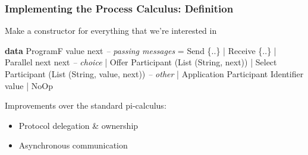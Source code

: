 \documentclass[12pt]{beamer}
\newenvironment{Shaded}{}{}
\newcommand{\KeywordTok}[1]{\textcolor[rgb]{0.00,0.44,0.13}{\textbf{#1}}}
\newcommand{\DataTypeTok}[1]{\textcolor[rgb]{0.56,0.13,0.00}{#1}}
\newcommand{\CommentTok}[1]{\textcolor[rgb]{0.38,0.63,0.69}{\textit{#1}}}
\newcommand{\FunctionTok}[1]{\textcolor[rgb]{0.02,0.16,0.49}{#1}}
\newcommand{\NormalTok}[1]{#1}
\begin{document}
\begin{frame}[fragile, t]
\frametitle{Implementing the Process Calculus: Definition}

Make a constructor for everything that we're interested in

\begin{Shaded}
\begin{Highlighting}[]
\KeywordTok{data} \DataTypeTok{ProgramF}\NormalTok{ value next }
    \CommentTok{-- passing messages}
    \FunctionTok{=} \DataTypeTok{Send}\NormalTok{ \{..\}}
    \FunctionTok{|} \DataTypeTok{Receive}\NormalTok{ \{..\}}
    \FunctionTok{|} \DataTypeTok{Parallel}\NormalTok{ next next }
    \CommentTok{-- choice}
    \FunctionTok{|} \DataTypeTok{Offer} \DataTypeTok{Participant}\NormalTok{ (}\DataTypeTok{List}\NormalTok{ (}\DataTypeTok{String}\NormalTok{, next))}
    \FunctionTok{|} \DataTypeTok{Select} \DataTypeTok{Participant}\NormalTok{ (}\DataTypeTok{List}\NormalTok{ (}\DataTypeTok{String}\NormalTok{, value, next))}
    \CommentTok{-- other}
    \FunctionTok{|} \DataTypeTok{Application} \DataTypeTok{Participant} \DataTypeTok{Identifier}\NormalTok{ value}
    \FunctionTok{|} \DataTypeTok{NoOp}
\end{Highlighting}
\end{Shaded}

Improvements over the standard pi-calculus:
\begin{itemize}
    \item Protocol delegation \& ownership
    \item Asynchronous communication 
\end{itemize}


\end{frame}
\end{document}
